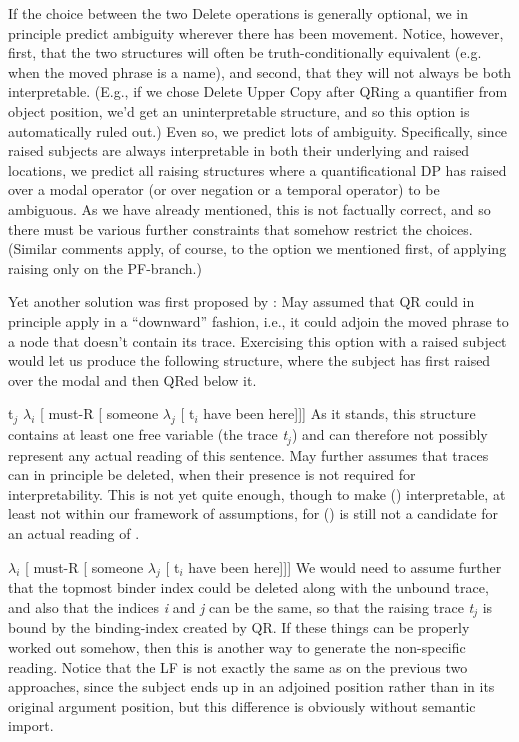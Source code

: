 If the choice between the two Delete operations is generally optional, we in
principle predict ambiguity wherever there has been movement. Notice, however,
first, that the two structures will often be truth-conditionally equivalent
(e.g. when the moved phrase is a name), and second, that they will not always be
both interpretable. (E.g., if we chose Delete Upper Copy after QRing a
quantifier from object position, we'd get an uninterpretable structure, and so
this option is automatically ruled out.) Even so, we predict lots of ambiguity.
Specifically, since raised subjects are always interpretable in both their
underlying and raised locations, we predict all raising structures where a
quantificational DP has raised over a modal operator (or over negation or a
temporal operator) to be ambiguous. As we have already mentioned, this is not
factually correct, and so there must be various further constraints that somehow
restrict the choices. (Similar comments apply, of course, to the option we
mentioned first, of applying raising only on the PF-branch.)

Yet another solution was first proposed by \citet{may:1977:thesis}: May assumed
that QR could in principle apply in a ``downward'' fashion, i.e., it could
adjoin the moved phrase to a node that doesn't contain its trace. Exercising
this option with a raised subject would let us produce the following structure,
where the subject has first raised over the modal and then QRed below it.

\ex t$_j$ $\lambda_i$ [ must-R [ someone $\lambda_j$ [ t$_i$ have been here]]] \xe
%
As it stands, this structure contains at least one free variable (the trace
\emph{t}$_j$) and can therefore not possibly represent any actual reading of
this sentence. May further assumes that traces can in principle be deleted, when
their presence is not required for interpretability. This is not yet quite
enough, though to make (\lastx) interpretable, at least not within our framework
of assumptions, for (\nextx) is still not a candidate for an actual reading of
.

\ex $\lambda_i$ [ must-R [ someone $\lambda_j$ [ t$_i$ have been here]]] \xe
%
We would need to assume further that the topmost binder index could be deleted
along with the unbound trace, and also that the indices \emph{i} and \emph{j}
can be the same, so that the raising trace \emph{t}$_j$ is bound by the
binding-index created by QR. If these things can be properly worked out somehow,
then this is another way to generate the non-specific reading. Notice that the
LF is not exactly the same as on the previous two approaches, since the subject
ends up in an adjoined position rather than in its original argument position,
but this difference is obviously without semantic import.

